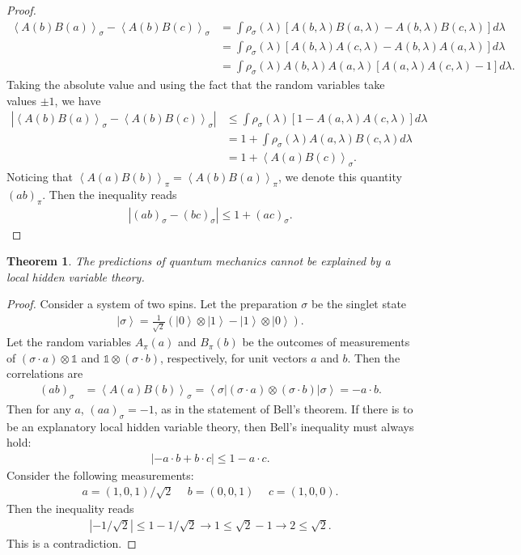 \documentclass[]{article}
\newcommand{\ket}[1]{\left\vert#1\right\rangle}
\newcommand{\bra}[1]{\left\langle#1\right\vert}
\newcommand{\brak}[1]{\left\langle#1\right\rangle}
\newcommand{\modulus}[1]{\left\vert#1\right\vert}
\theoremstyle{plain}
\newtheorem{theorem}{Theorem}
\theoremstyle{definition}
\theoremstyle{remark}
\begin{document}
\begin{proof}
\begin{align}
\brak{A(b)B(a)}_\sigma-\brak{A(b)B(c)}_\sigma&=\int\rho_\sigma(\lambda)\left[A(b,\lambda)B(a,\lambda)-A(b,\lambda)B(c,\lambda)\right]d\lambda\\
&=\int\rho_\sigma(\lambda)\left[A(b,\lambda)A(c,\lambda)-A(b,\lambda)A(a,\lambda)\right]d\lambda\\
&=\int\rho_\sigma(\lambda)A(b,\lambda)A(a,\lambda)\left[A(a,\lambda)A(c,\lambda)-1\right]d\lambda.
\end{align}
Taking the absolute value and using the fact that the random variables take values $\pm 1$, we have
\begin{align}
\modulus{\brak{A(b)B(a)}_\sigma-\brak{A(b)B(c)}_\sigma}&\leq\int\rho_\sigma(\lambda)\left[1-A(a,\lambda)A(c,\lambda)\right]d\lambda\\
&=1+\int\rho_\sigma(\lambda)A(a,\lambda)B(c,\lambda)d\lambda\\
&=1+\brak{A(a)B(c)}_\sigma.
\end{align}
Noticing that $\brak{A(a)B(b)}_\pi=\brak{A(b)B(a)}_\pi$, we denote this quantity $(ab)_\pi$. Then the inequality reads
\begin{align}
\modulus{(ab)_\sigma-(bc)_\sigma}\leq 1+(ac)_\sigma.
\end{align}
\end{proof}

\begin{theorem}
The predictions of quantum mechanics cannot be explained by a local hidden variable theory.
\end{theorem}
	
\begin{proof}
Consider a system of two spins. Let the preparation $\sigma$ be the singlet state
\begin{align}
\ket{\sigma}=\frac{1}{\sqrt{2}}\left(\ket{0}\otimes\ket{1}-\ket{1}\otimes\ket{0}\right).
\end{align}
Let the random variables $A_\pi(a)$ and $B_\pi(b)$ be the outcomes of measurements of $(\sigma\cdot a)\otimes\mathbb{1}$ and $\mathbb{1}\otimes(\sigma\cdot b)$, respectively, for unit vectors $a$ and $b$. Then the correlations are
\begin{align}
(ab)_\sigma&=\brak{A(a)B(b)}_\sigma=\bra{\sigma}(\sigma\cdot a)\otimes(\sigma\cdot b)\ket{\sigma}=-a\cdot b.
\end{align}
Then for any $a$, $(aa)_\sigma=-1$, as in the statement of Bell's theorem. If there is to be an explanatory local hidden variable theory, then Bell's inequality must always hold:
\begin{align}
\modulus{-a\cdot b+b\cdot c}\leq 1-a\cdot c.
\end{align}
Consider the following measurements:
\begin{align}
a=(1,0,1)/\sqrt{2}\hspace{15pt}b=(0,0,1)\hspace{15pt}c=(1,0,0).
\end{align}
Then the inequality reads
\begin{align}
\modulus{-1/\sqrt{2}}\leq 1-1/\sqrt{2}\longrightarrow 1\leq \sqrt{2}-1\longrightarrow 2\leq\sqrt{2}.
\end{align}
This is a contradiction.
\end{proof}
\end{document}
